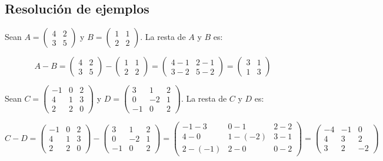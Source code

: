 \subsection{Resolución de ejemplos}
\begin{example}
Sean \( A = \begin{pmatrix} 4 & 2 \\ 3 & 5 \end{pmatrix} \) y \( B = \begin{pmatrix} 1 & 1 \\ 2 & 2 \end{pmatrix} \). La resta de \( A \) y \( B \) es:

\[ A - B = \begin{pmatrix} 4 & 2 \\ 3 & 5 \end{pmatrix} - \begin{pmatrix} 1 & 1 \\ 2 & 2 \end{pmatrix} = \begin{pmatrix} 4 - 1 & 2 - 1 \\ 3 - 2 & 5 - 2 \end{pmatrix} = \begin{pmatrix} 3 & 1 \\ 1 & 3 \end{pmatrix} \]
\end{example}
\begin{example}
Sean \( C = \begin{pmatrix} -1 & 0 & 2 \\ 4 & 1 & 3 \\ 2 & 2 & 0 \end{pmatrix} \) y \( D = \begin{pmatrix} 3 & 1 & 2 \\ 0 & -2 & 1 \\ -1 & 0 & 2 \end{pmatrix} \). La resta de \( C \) y \( D \) es:

\[ C - D = \begin{pmatrix} -1 & 0 & 2 \\ 4 & 1 & 3 \\ 2 & 2 & 0 \end{pmatrix} - \begin{pmatrix} 3 & 1 & 2 \\ 0 & -2 & 1 \\ -1 & 0 & 2 \end{pmatrix} = \begin{pmatrix} -1 - 3 & 0 - 1 & 2 - 2 \\ 4 - 0 & 1 - (-2) & 3 - 1 \\ 2 - (-1) & 2 - 0 & 0 - 2 \end{pmatrix} = \begin{pmatrix} -4 & -1 & 0 \\ 4 & 3 & 2 \\ 3 & 2 & -2 \end{pmatrix} \]
    
\end{example}
